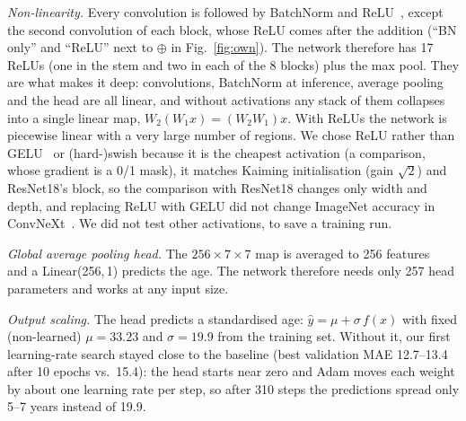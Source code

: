\documentclass[conference,a4paper]{IEEEtran}
\begin{document}
\emph{Non-linearity.} Every convolution is followed by BatchNorm and ReLU~\cite{nair2010relu}, except the second convolution of each block, whose ReLU comes after the addition (``BN only'' and ``ReLU'' next to $\oplus$ in Fig.~\ref{fig:own}). The network therefore has 17 ReLUs (one in the stem and two in each of the 8 blocks) plus the max pool. They are what makes it deep: convolutions, BatchNorm at inference, average pooling and the head are all linear, and without activations any stack of them collapses into a single linear map, $W_2(W_1x) = (W_2W_1)x$. With ReLUs the network is piecewise linear with a very large number of regions. We chose ReLU rather than GELU~\cite{hendrycks2016gelu} or (hard-)swish because it is the cheapest activation (a comparison, whose gradient is a 0/1 mask), it matches Kaiming initialisation (gain $\sqrt{2}$) and ResNet18's block, so the comparison with ResNet18 changes only width and depth, and replacing ReLU with GELU did not change ImageNet accuracy in ConvNeXt~\cite{liu2022convnext}. We did not test other activations, to save a training run.

\emph{Global average pooling head.} The $256\times7\times7$ map is averaged to 256 features~\cite{lin2014nin} and a Linear(256,\,1) predicts the age. The network therefore needs only 257 head parameters and works at any input size.

\emph{Output scaling.} The head predicts a standardised age: $\hat{y} = \mu + \sigma\, f(x)$ with fixed (non-learned) $\mu = 33.23$ and $\sigma = 19.9$ from the training set. Without it, our first learning-rate search stayed close to the baseline (best validation MAE 12.7--13.4 after 10 epochs vs.\ 15.4): the head starts near zero and Adam moves each weight by about one learning rate per step, so after 310 steps the predictions spread only 5--7 years instead of 19.9.
\end{document}
